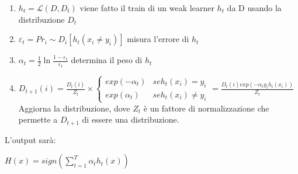 \begin{enumerate}

 \item  \begin{math} h_t=\mathcal{L}(D,D_t)\end{math} viene fatto il train di un weak learner  \begin{math} h_t\end{math} da D usando la distribuzione
\begin{math} D_t\end{math}
\item \begin{math} \varepsilon_t=Pr{_i\sim D_i} [h_t(x_i\ne y_i)] \end{math}   misura l'errore di \begin{math} h_t\end{math}
\item \begin{math} \alpha_t=\frac{1}{2}\ln\frac{1-\varepsilon_t}{\varepsilon_t}  \end{math} 
determina il peso di \begin{math} h_t\end{math}

\item \begin{math} D_{t+1}(i)=\frac{D_t(i)}{Z_t}\times \begin{cases} exp(-\alpha_t) & se h_t(x_i)=y_i \\
                                                         exp(\alpha_t) & se h_t(x_i)\ne y_i
                                                       
                                                      \end{cases} =\frac{D_t(i)exp(-\alpha_ty_ih_t(x_i))}{Z_t} \end{math} \\
\newline
Aggiorna la distribuzione, dove \begin{math}Z_t \end{math} \`e un fattore di normalizzazione che permette a \begin{math}D_{t+1} \end{math}
di essere una distribuzione.


\end{enumerate}
L'output sar\`a:
\begin{center}
 \begin{math} H(x)=sign(\sum_{t=1}^T \alpha_t h_t(x)) \end{math}
\end{center}

